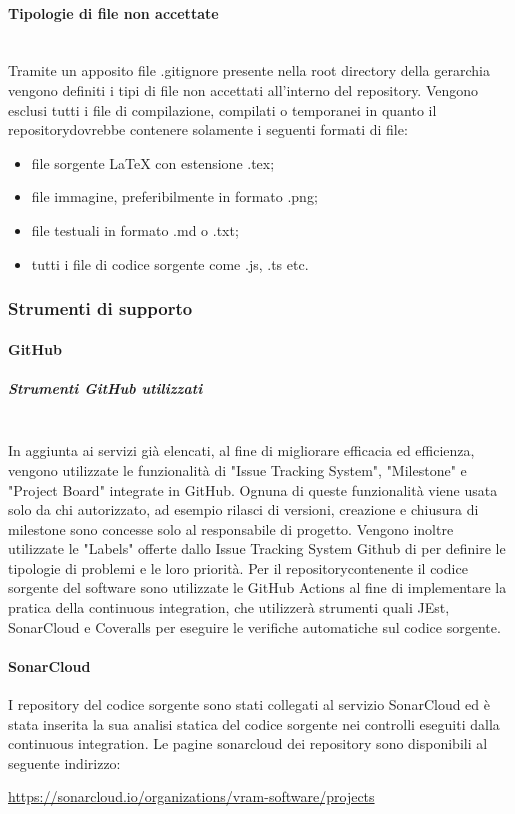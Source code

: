 	\paragraph{Tipologie di file non accettate}\mbox{}\\ [1mm]
		Tramite un apposito file .gitignore presente nella root directory della gerarchia vengono definiti i tipi di file non accettati all'interno del repository\glo. Vengono esclusi tutti i file di compilazione, compilati o temporanei in quanto il repository\glosp dovrebbe contenere solamente i seguenti formati di file:
		\begin{itemize}
			\item file sorgente \LaTeX \xspace con estensione .tex;
			\item file immagine, preferibilmente in formato .png;
			\item file testuali in formato .md o .txt;
			\item tutti i file di codice sorgente come .js, .ts etc.		
		\end{itemize}
	\subsubsection{Strumenti di supporto}
	\paragraph{GitHub}
	\subparagraph*{Strumenti GitHub utilizzati}\mbox{}\\ [1mm]
		In aggiunta ai servizi già elencati, al fine di migliorare efficacia ed efficienza, vengono utilizzate le funzionalità di "Issue Tracking System",
		"Milestone" e "Project Board" integrate in GitHub. Ognuna di queste funzionalità viene usata solo da chi autorizzato, ad esempio rilasci di versioni, creazione e chiusura di milestone sono concesse solo al responsabile di progetto\glo.
		\newline
		Vengono inoltre utilizzate le "Labels" offerte dallo Issue Tracking System Github di per definire le tipologie di problemi e le loro priorità.
		\newline
		Per il repository\glosp contenente il codice sorgente del software sono utilizzate le GitHub Actions al fine di implementare la pratica della continuous integration, che utilizzerà strumenti quali JEst, SonarCloud e Coveralls per eseguire le verifiche automatiche sul codice sorgente.
	\paragraph{SonarCloud}
	I repository del codice sorgente sono stati collegati al servizio SonarCloud ed è stata inserita la sua analisi statica del codice sorgente nei controlli eseguiti dalla continuous integration. Le pagine sonarcloud dei repository sono disponibili al seguente indirizzo: 
	\begin{center}
		\url{https://sonarcloud.io/organizations/vram-software/projects}
	\end{center}
